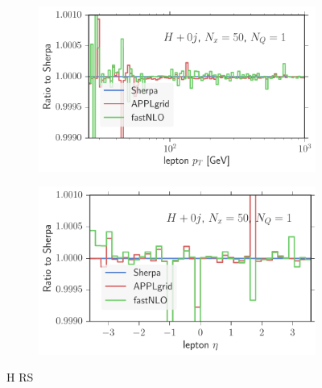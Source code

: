 \begin{figure}
\begin{subfigure}[]{0.49\textwidth}
	\includegraphics[width=\textwidth]{images/hrs_lpt.pdf}
\end{subfigure}
\hfill
\begin{subfigure}[]{0.49\textwidth}
	\includegraphics[width=\textwidth]{images/hrs_leta.pdf}
\end{subfigure}
\caption{H RS}
\end{figure}
%
